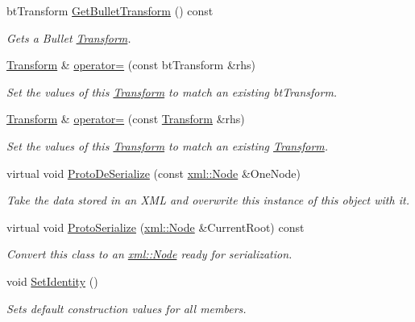 \begin{DoxyCompactItemize}
btTransform \hyperlink{classMezzanine_1_1Transform_ae1745852b61f7388a5374eeebdc893cd}{GetBulletTransform} () const 
\begin{DoxyCompactList}\small\item\em Gets a Bullet \hyperlink{classMezzanine_1_1Transform}{Transform}. \item\end{DoxyCompactList}\item 
\hyperlink{classMezzanine_1_1Transform}{Transform} \& \hyperlink{classMezzanine_1_1Transform_a4ea68563eacb2f69a4e83a0c28392b74}{operator=} (const btTransform \&rhs)
\begin{DoxyCompactList}\small\item\em Set the values of this \hyperlink{classMezzanine_1_1Transform}{Transform} to match an existing btTransform. \item\end{DoxyCompactList}\item 
\hyperlink{classMezzanine_1_1Transform}{Transform} \& \hyperlink{classMezzanine_1_1Transform_aa21521163611bf58988caf99c085d067}{operator=} (const \hyperlink{classMezzanine_1_1Transform}{Transform} \&rhs)
\begin{DoxyCompactList}\small\item\em Set the values of this \hyperlink{classMezzanine_1_1Transform}{Transform} to match an existing \hyperlink{classMezzanine_1_1Transform}{Transform}. \item\end{DoxyCompactList}\item 
virtual void \hyperlink{classMezzanine_1_1Transform_aa58fe89c84a189cfb2c6a0594c37e071}{ProtoDeSerialize} (const \hyperlink{classMezzanine_1_1xml_1_1Node}{xml::Node} \&OneNode)
\begin{DoxyCompactList}\small\item\em Take the data stored in an XML and overwrite this instance of this object with it. \item\end{DoxyCompactList}\item 
virtual void \hyperlink{classMezzanine_1_1Transform_a7bc390c5875493870d8eff4a36685457}{ProtoSerialize} (\hyperlink{classMezzanine_1_1xml_1_1Node}{xml::Node} \&CurrentRoot) const 
\begin{DoxyCompactList}\small\item\em Convert this class to an \hyperlink{classMezzanine_1_1xml_1_1Node}{xml::Node} ready for serialization. \item\end{DoxyCompactList}\item 
\hypertarget{classMezzanine_1_1Transform_a8d9f45cf621609dc884712c3beb3a501}{
void \hyperlink{classMezzanine_1_1Transform_a8d9f45cf621609dc884712c3beb3a501}{SetIdentity} ()}
\label{classMezzanine_1_1Transform_a8d9f45cf621609dc884712c3beb3a501}

\begin{DoxyCompactList}\small\item\em Sets default construction values for all members. \item\end{DoxyCompactList}\end{DoxyCompactItemize}

